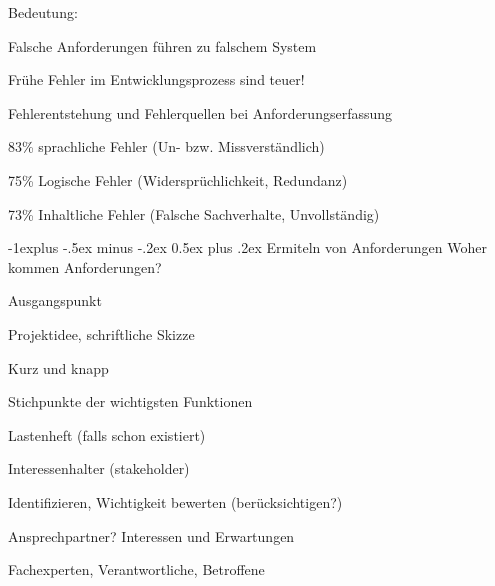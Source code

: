 \documentclass[a4paper]{article}
\makeatletter
\renewcommand{\subsection}{\@startsection{subsection}{2}{0mm}%
                                {-1explus -.5ex minus -.2ex}%
                                {0.5ex plus .2ex}%
                                {\normalfont\normalsize\bfseries}}
\makeatother
\begin{document}
\begin{multicols}{3}
  Bedeutung:
  \begin{itemize*}
    \item Falsche Anforderungen führen zu falschem System
    \item Frühe Fehler im Entwicklungsprozess sind teuer!
  \end{itemize*}

  Fehlerentstehung und Fehlerquellen bei Anforderungserfassung
  \begin{itemize*}
    \item 83\% sprachliche Fehler (Un- bzw. Missverständlich)
    \item 75\% Logische Fehler (Widersprüchlichkeit, Redundanz)
    \item 73\% Inhaltliche Fehler (Falsche Sachverhalte, Unvollständig)
  \end{itemize*}

  \subsection{Ermiteln von Anforderungen}
  Woher kommen Anforderungen?
  \begin{itemize*}
    \item Ausgangspunkt
          \begin{itemize*}
            \item Projektidee, schriftliche Skizze
            \item Kurz und knapp
            \item Stichpunkte der wichtigsten Funktionen
            \item Lastenheft (falls schon existiert)
          \end{itemize*}
    \item Interessenhalter (stakeholder)
          \begin{itemize*}
            \item Identifizieren, Wichtigkeit bewerten (berücksichtigen?)
            \item Ansprechpartner? Interessen und Erwartungen
            \item Fachexperten, Verantwortliche, Betroffene
          \end{itemize*}
  \end{itemize*}


\end{multicols}
\end{document}
